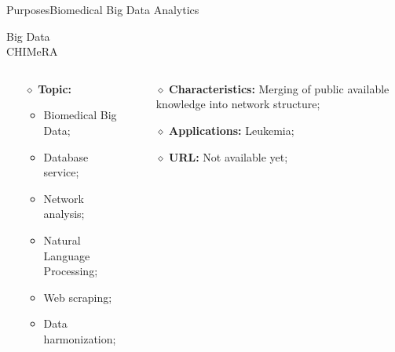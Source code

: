 \documentclass[10pt, technote, oribibl, unicode]{beamer}
\begin{document}
\begin{frame}{Purposes}{Biomedical Big Data Analytics}
  \begin{alertblock}{Big Data\\CHIMeRA}
    \begin{columns}
      \begin{column}{0.45\textwidth}
        \begin{itemize}
          \item[$\diamond$] \textbf{Topic:}
            \begin{itemize}
              \item Biomedical Big Data;
              \item Database service;
              \item Network analysis;
              \item Natural Language Processing;
              \item Web scraping;
              \item Data harmonization;
            \end{itemize}
          \end{itemize}
      \end{column}
      \begin{column}{0.55\textwidth}
        \begin{itemize}
          \item[$\diamond$] \textbf{Characteristics:} Merging of public available knowledge into network structure;
          \item[$\diamond$] \textbf{Applications:} Leukemia;
          \item[$\diamond$] \textbf{URL:} Not available yet;
        \end{itemize}
      \end{column}
    \end{columns}
  \end{alertblock}

\end{frame}

\end{document}
